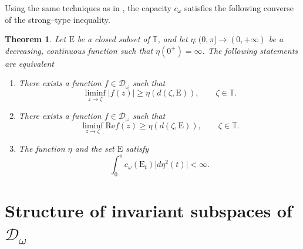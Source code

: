 \documentclass[12pt,reqno,a4paper]{amsart}
\newtheorem{theo}[prop]{Theorem}
\renewcommand{\Re}{\mathrm{Re }}
\newcommand{\Ee}{\mathrm{E}}
\newcommand\TT{\mathbb{T}}
\newcommand{\cD}{{\mathcal{D}}}
\numberwithin{equation}{section}
\begin{document}
	Using the same techniques as in \cite{EL}, the capacity $c_\omega$ satisfies the following converse of the strong--type inequality.
	\begin{theo}\label{ConverseStrongInequality}
		Let $\Ee$ be a closed subset of $\TT$, and let  $\eta : (0,\pi]\rightarrow (0,+\infty)$ be a decreasing, continuous function such that $\eta(0^+)=\infty$. The following statements are equivalent
		\begin{enumerate}
			\item[A.] There exists a function $f\in \cD_\omega$ such that 
			\begin{equation*}\label{BB1}
				\liminf_{z\rightarrow \zeta}\vert f(z)\vert\geq \eta(d(\zeta,\Ee)), \qquad \zeta \in \TT. 
			\end{equation*}
			\item[B.] There exists a function $f\in \cD_\omega$ such that 
			\begin{equation*}\label{RR1}
				\liminf_{z\rightarrow \zeta}\Re f(z)\geq \eta(d(\zeta,\Ee)), \qquad \zeta \in \TT.
			\end{equation*}
			\item[C.] The function $\eta$ and the set $\Ee$ satisfy 
			\begin{equation*}\label{CC1}
				\int_0^\pi c_\omega (\Ee_t)\vert d\eta^2(t)\vert<\infty.
			\end{equation*} 
		\end{enumerate}
	\end{theo}
	
	
	
	
	\section{Structure of invariant subspaces of $\cD_\omega$}\label{Structure}
	
	
\end{document}
